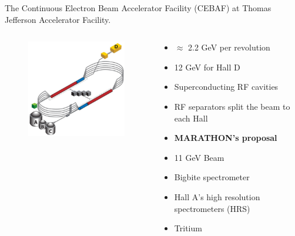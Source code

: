 \documentclass[12pt,usenames,dvipsnames]{beamer}
\begin{document}
\begin{frame}
The Continuous Electron Beam Accelerator Facility (CEBAF) at Thomas Jefferson Accelerator Facility.\\

\vspace{-10pt}
\begin{columns}[c]
		\begin{figure}
			\includegraphics[width=5.5cm]{../images/cebaf.pdf}
		\end{figure}
		\begin{block}{}
			\begin{itemize}
				\addtolength{\itemindent}{-1em}
				\item $\approx$ 2.2 GeV per revolution
				\item 12 GeV for Hall D
				\item Superconducting RF cavities
				\item RF separators split the beam to each Hall
				\item [] \hspace{-15pt}\textbf{MARATHON's proposal }
				\item 11 GeV Beam	
				\item Bigbite spectrometer
				\item Hall A's high resolution spectrometers (HRS)
				\item Tritium
			\end{itemize}
		\end{block}
\end{columns}
\end{frame}
\end{document}
